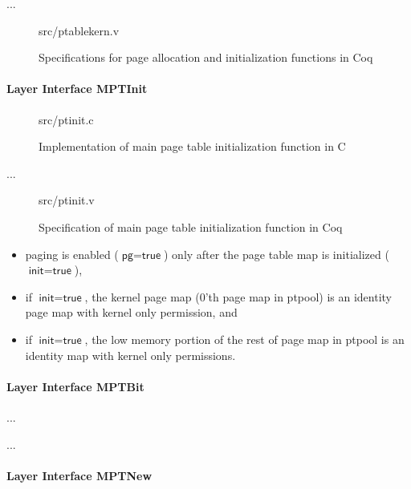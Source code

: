 ...

\begin{figure}
	 {src/ptablekern.v}
	\caption{Specifications for page allocation and initialization functions in Coq}
	\label{fig:ptablekern_v}
\end{figure}

\paragraph{Layer Interface MPTInit}

\begin{figure}
	 {src/ptinit.c}
	\caption{Implementation of main page table initialization function in C}
	\label{fig:ptinit_c}
\end{figure}

...

\begin{figure}
	 {src/ptinit.v}
	\caption{Specification of main page table initialization function in Coq}
	\label{fig:ptinit_v}
\end{figure}


\begin{invariant}
\begin{itemize}
\item paging is enabled ($\textsf{pg}=\textsf{true}$) only after the page table map is initialized ($\textsf{init}=\textsf{true}$),
\item if $\textsf{init}=\textsf{true}$, the kernel page map (0'th page map in \textsf{ptpool}) is an identity page map with kernel only permission, and
\item if $\textsf{init}=\textsf{true}$, the low memory portion of the rest of page map in \textsf{ptpool} is an identity map with kernel only permissions.
\end{itemize}
\end{invariant}

\paragraph{Layer Interface MPTBit}
...

...



\paragraph{Layer Interface MPTNew}


